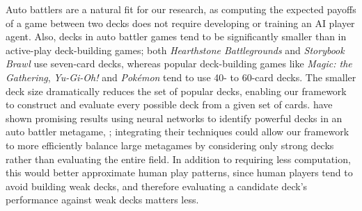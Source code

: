 Auto battlers are a natural fit for our research, as computing the
expected payoffs of a game between two decks does not require
developing or training an AI player agent. Also, decks in auto battler
games tend to be significantly smaller than in active-play
deck-building games; both \textit{Hearthstone Battlegrounds} and
\textit{Storybook Brawl} use seven-card decks, whereas popular
deck-building games like \textit{Magic: the Gathering},
\textit{Yu-Gi-Oh!} and \textit{Pok\'{e}mon} tend to use 40- to 60-card
decks.
The smaller deck size dramatically reduces the set of popular decks,
enabling our framework to construct and evaluate every possible deck
from a given set of cards. \citeauthor{xumining} have shown promising
results using neural networks to identify powerful decks in an auto
battler metagame, \cite{xumining}; integrating their techniques could
allow our framework to more efficiently balance large metagames by
considering only strong decks rather than evaluating the entire
field. In addition to requiring less computation, this would better
approximate human play patterns, since human players tend to avoid
building weak decks, and therefore evaluating a candidate deck's
performance against weak decks matters less.

